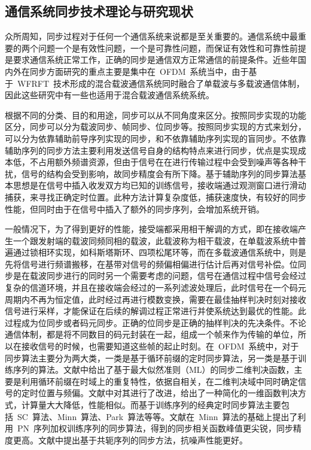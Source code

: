 \subsection{通信系统同步技术理论与研究现状}
众所周知，同步过程对于任何一个通信系统来说都是至关重要的。通信系统中最重要的两个问题一个是有效性问题，一个是可靠性问题，而保证有效性和可靠性前提是要求通信系统正常工作，正确的同步是通信双方正常通信的前提条件。近些年国内外在同步方面研究的重点主要是集中在~OFDM~系统当中，由于基于~WFRFT~技术形成的混合载波通信系统同时融合了单载波与多载波通信体制，因此这些研究中有一些也适用于混合载波通信系统系统。

根据不同的分类、目的和用途，同步可以从不同角度来区分。按照同步实现的功能区分，同步可以分为载波同步、帧同步、位同步等。按照同步实现的方式来划分，可以分为依靠辅助前导序列实现的同步，和不依靠辅助序列实现的盲同步。不依靠辅助序列的同步方法主要利用发送信号自身的结构特点来进行同步，优点是实现成本低，不占用额外频谱资源，但由于信号在在进行传输过程中会受到噪声等各种干扰，信号的结构会受到影响，故同步精度会有所下降。基于辅助序列的同步算法基本思想是在信号中插入收发双方均已知的训练信号，接收端通过观测窗口进行滑动捕获，来寻找正确定时位置。此种方法计算复杂度低，捕获速度快，有较好的同步性能，但同时由于在信号中插入了额外的同步序列，会增加系统开销。

一般情况下，为了得到更好的性能，接受端都采用相干解调的方式，即在接收端产生一个跟发射端的载波同频同相的载波，此载波称为相干载波，在单载波系统中普遍通过锁相环实现，如科斯塔斯环、四项松尾环等，而在多载波通信系统中，则是先将信号进行频谱搬移，在基带对信号的频偏相偏进行估计后再对信号补偿。位同步是在载波同步进行的同时另一个需要考虑的问题，信号在通信过程中信号会经过复杂的信道环境，并且在接收端会经过的一系列滤波处理后，此时信号在一个码元周期内不再为恒定值，此时经过再进行模数变换，需要在最佳抽样判决时刻对接收信号进行采样，才能保证在后续的解调过程正常进行并使系统达到最优的性能。此过程成为位同步或者码元同步。正确的位同步是正确的抽样判决的先决条件。不论通信体制，都是将不同数目的码元封装在一起，组成一个帧来作为传输的单位，所以在接收信号的时候，也需要知道这些帧的起止时刻。在~OFDM~系统中，对于同步算法主要分为两大类，一类是基于循环前缀的定时同步算法，另一类是基于训练序列的算法。文献中给出了基于最大似然准则（ML）的同步二维判决函数，主要是利用循环前缀在时域上的重复特性，依据自相关，在二维判决域中同时确定信号的定时位置与频偏。文献中对其进行了改进，给出了一种简化的一维函数判决方式，计算量大大降低，性能相似。而基于训练序列的经典定时同步算法主要包括~SC~算法、Minn~算法、Park~算法等等。文献在~Minn~算法的基础上提出了利用~PN~序列加权训练序列的同步算法，得到的同步相关函数峰值更尖锐，同步精度更高。文献中提出基于共轭序列的同步方法，抗噪声性能更好。

